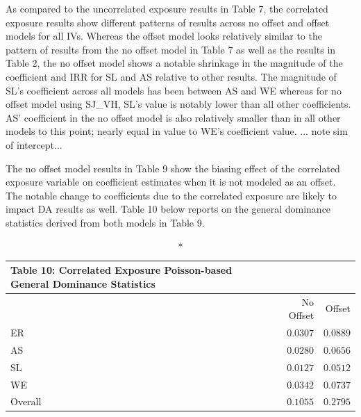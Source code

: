 \documentclass[ShortAfour,times,sageapa]{sagej}
\begin{document}
	As compared to the uncorrelated exposure results in Table 7, the correlated exposure results show different patterns of results across no offset and offset models for all IVs.
	Whereas the offset model looks relatively similar to the pattern of results from the no offset model in Table 7 as well as the results in Table 2, the no offset model shows a notable shrinkage in the magnitude of the coefficient and IRR for SL and AS relative to other results.
	The magnitude of SL's coefficient across all models has been between AS and WE whereas for no offset model using SJ\_VH, SL's value is notably lower than all other coefficients.
	AS' coefficient in the no offset model is also relatively smaller than in all other models to this point; nearly equal in value to WE's coefficient value.
	... note sim of intercept...
	
	The no offset model results in Table 9 show the biasing effect of the correlated exposure variable on coefficient estimates when it is not modeled as an offset.
	The notable change to coefficients due to the correlated exposure are likely to impact DA results as well.	
	Table 10 below reports on the general dominance statistics derived from both models in Table 9.
	
	\begin{longtable}{l|rr}
		\caption*{
			{\large Table 10: Correlated Exposure Poisson-based General Dominance Statistics}
		} \\ 
		\toprule
		\multicolumn{1}{l}{} & No Offset & Offset \\ 
		\midrule
		ER & $0.0307$ & $0.0889$ \\ 
		AS & $0.0280$ & $0.0656$ \\ 
		SL & $0.0127$ & $0.0512$ \\ 
		WE & $0.0342$ & $0.0737$ \\ 
		\midrule
		Overall & $0.1055$ & $0.2795$ \\ 
		\bottomrule
	\end{longtable}
\end{document}
